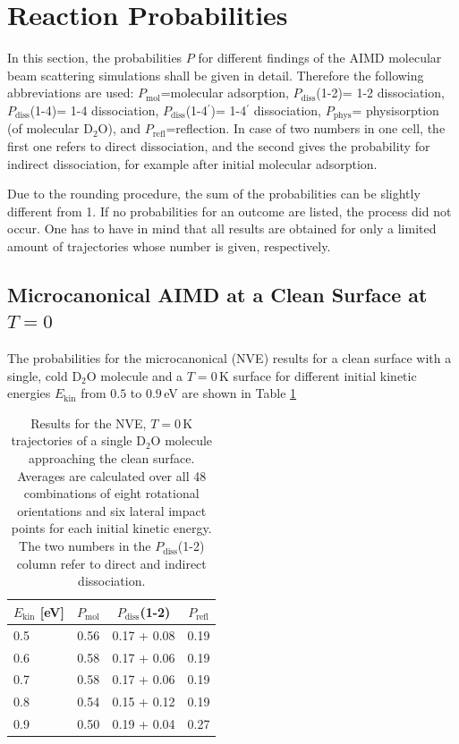 \documentclass[11pt,DIV=13,BCOR=5mm,a4paper,headinclude]{scrbook}
\begin{document}
\section{Reaction Probabilities}\label{reactionprobabilities}
In this section, the probabilities $P$ for different findings of the AIMD molecular beam scattering simulations shall be given in detail.
Therefore the following abbreviations are used: $P_\textrm{mol}$=molecular adsorption, 
 $P_\textrm{diss}$(1-2)= 1-2 dissociation, $P_\textrm{diss}$(1-4)= 1-4 dissociation, $P_\textrm{diss}$(1-4$^\prime$)= 1-4$^\prime$ dissociation, $P_\textrm{phys}$= physisorption (of molecular D$_2$O), and $P_\textrm{refl}$=reflection.
In case of two numbers in one cell, the first one refers to direct dissociation, and the second gives the probability for indirect dissociation, for example after initial molecular adsorption.


Due to the rounding procedure, the sum of the probabilities can be slightly different from 1.
If no probabilities for an outcome are listed, the process did not occur.
One has to have in mind that all results are obtained for only a limited amount of trajectories whose number is given, respectively.


\subsection{Microcanonical AIMD at a Clean Surface at $T=0$}
The probabilities for the microcanonical (NVE) results for a clean surface with a single, cold D$_2$O molecule and a $T=0\,$K surface for different initial kinetic energies $E_\textrm{kin}$ from $0.5$ to $0.9\,$eV are shown in Table \ref{tab:mic_ekin}

\begin{table}[!h]
 \centering
  \caption{Results for the NVE, $T=0\,$K trajectories of a single D$_2$O molecule approaching the clean surface.
Averages are calculated over all 48 combinations of eight rotational orientations and six lateral impact points for each initial kinetic energy. The two numbers in the $P_\textrm{diss}$(1-2) column refer to direct and indirect dissociation.}
%
 \begin{tabular}{l|ccc}
\toprule
 $E_\textrm{kin}$ [eV]&$P_\textrm{mol}$ & $P_\textrm{diss}$(1-2) & $P_\textrm{refl}$ \\\midrule
 0.5 & 0.56& 0.17 + 0.08& 0.19\\
 0.6 & 0.58& 0.17 + 0.06& 0.19\\
 0.7 & 0.58& 0.17 + 0.06& 0.19\\
 0.8 & 0.54& 0.15 + 0.12& 0.19\\
 0.9 & 0.50& 0.19 + 0.04& 0.27\\\bottomrule
\end{tabular}
 \label{tab:mic_ekin}
\end{table}
%
\end{document}
